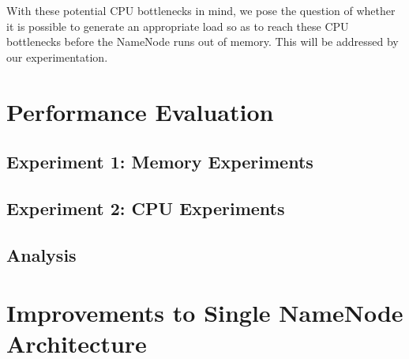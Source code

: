\documentclass[11pt, a4paper]{article}
\begin{document}
\begin{multicols*}{2}
With these potential CPU bottlenecks in mind, we pose the question of whether it is possible to generate an appropriate load so as to reach these CPU bottlenecks before the NameNode runs out of memory. This will be addressed by our experimentation. 

\section{Performance Evaluation}




\subsection{Experiment 1: Memory Experiments}


\subsection{Experiment 2: CPU Experiments}


\subsection{Analysis}




\section{Improvements to Single NameNode Architecture}


\end{multicols*}
\end{document}
